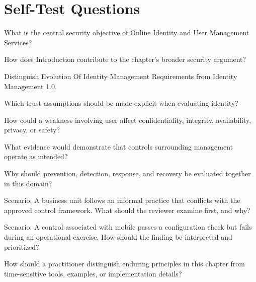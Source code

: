 \documentclass[11pt,letterpaper]{article}
\begin{document}
\section*{Self-Test Questions}
\begin{CornellRecallList}
\item What is the central security objective of Online Identity and User Management Services?
\item How does Introduction contribute to the chapter's broader security argument?
\item Distinguish Evolution Of Identity Management Requirements from Identity Management 1.0.
\item Which trust assumptions should be made explicit when evaluating identity?
\item How could a weakness involving user affect confidentiality, integrity, availability, privacy, or safety?
\item What evidence would demonstrate that controls surrounding management operate as intended?
\item Why should prevention, detection, response, and recovery be evaluated together in this domain?
\item Scenario: A business unit follows an informal practice that conflicts with the approved control framework. What should the reviewer examine first, and why?
\item Scenario: A control associated with mobile passes a configuration check but fails during an operational exercise. How should the finding be interpreted and prioritized?
\item How should a practitioner distinguish enduring principles in this chapter from time-sensitive tools, examples, or implementation details?
\end{CornellRecallList}
\end{document}

